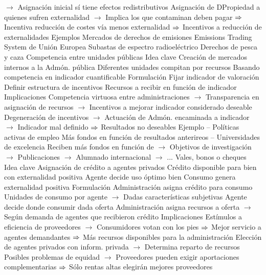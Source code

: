 \documentclass{nuevotema}
\begin{document}
\begin{esquemal}
				\4[] $\to$ Asignación inicial sí tiene efectos redistributivos
				\4[] Asignación de DPropiedad a quienes sufren externalidad
				\4[] $\to$ Implica los que contaminan deben pagar
				\4[] $\Rightarrow$ Incentiva reducción de costes vía menos externalidad
				\4[] $\Rightarrow$ Incentivos a reducción de externalidades
				\4 Ejemplos
				\4[] Mercados de derechos de emisiones
				\4[] Emissions Trading System de Unión Europea
				\4[] Subastas de espectro radioeléctrico
				\4[] Derechos de pesca y caza
			\3 Competencia entre unidades públicas
				\4 Idea clave
				\4[] Creación de mercados internos a la Admón. pública
				\4[] Diferentes unidades compitan por recursos
				\4[] Basando competencia en indicador cuantificable
				\4 Formulación
				\4[] Fijar indicador de valoración
				\4[] Definir estructura de incentivos
				\4[] Recursos a recibir en función de indicador
				\4 Implicaciones
				\4[] Competencia virtuosa entre administraciones
				\4[] $\to$ Transparencia en asignación de recursos
				\4[] $\to$ Incentivos a mejorar indicador considerado deseable
				\4[] Degeneración de incentivos
				\4[] $\to$ Actuación de Admón. encaminada a indicador
				\4[] $\to$ Indicador mal definido
				\4[] $\Rightarrow$ Resultados no deseables
				\4 Ejemplo
				\4[] -- Políticas activas de empleo
				\4[] Más fondos en función de resultados anterireos
				\4[] -- Universidades de excelencia
				\4[] Reciben más fondos en función de
				\4[] $\to$ Objetivos de investigación
				\4[] $\to$ Publicaciones
				\4[] $\to$ Alumnado internacional
				\4[] $\to$ ...
			\3 Vales, bonos o cheques
				\4 Idea clave
				\4[] Asignación de crédito a agentes privados
				\4[] Crédito disponible para bien con externalidad positiva
				\4[] Agente decide uso óptimo bien
				\4[] Consumo genera externalidad positiva
				\4 Formulación
				\4[] Administración asigna crédito para consumo
				\4[] Unidades de consumo por agente
				\4[] $\to$ Dadas características subjetivas
				\4[] Agente decide donde consumir dada oferta
				\4[] Administración asigna recursos a oferta
				\4[] $\to$ Según demanda de agentes que recibieron crédito
				\4 Implicaciones
				\4[] Estímulos a eficiencia de proveedores
				\4[] $\to$ Consumidores votan con los pies
				\4[] $\Rightarrow$ Mejor servicio a agentes demandantes
				\4[] $\Rightarrow$ Más recursos disponibles para la administración
				\4[] Elección de agentes privados con inform. privada
				\4[] $\to$ Determina reparto de recursos
				\4[] Posibles problemas de equidad
				\4[] $\to$ Proveedores pueden exigir aportaciones complementarias
				\4[] $\Rightarrow$ Sólo rentas altas elegirán mejores proveedores

\end{esquemal}
\end{document}

